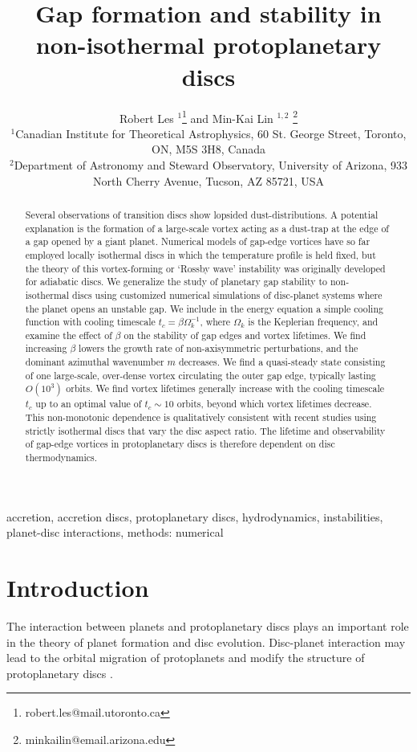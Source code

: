 \documentclass[useAMS,usenatbib]{mn2e}
\title[Gaps in non-isothermal discs]{Gap formation and stability in 
  non-isothermal protoplanetary discs}
\author[Les and Lin]{Robert Les
  $^1$\thanks{robert.les@mail.utoronto.ca} and Min-Kai Lin $^{1,2}$
  \thanks{ minkailin@email.arizona.edu} \\ 
  $^1$Canadian Institute for Theoretical Astrophysics,  
  60 St. George Street, Toronto, ON, M5S 3H8, Canada \\
  $^2$Department of Astronomy and Steward Observatory, University of
  Arizona, 933 North Cherry Avenue, Tucson, AZ 85721, USA 
}
\begin{document}
\maketitle
\begin{abstract}
  Several observations of transition discs show lopsided
  dust-distributions. A potential explanation is the formation of a
  large-scale vortex acting as a dust-trap at the edge of a gap opened
  by a giant planet. Numerical models of gap-edge vortices have
  so far employed locally isothermal discs in which the temperature profile is held fixed, but the 
  theory of this vortex-forming or `Rossby wave' instability was
  originally developed for adiabatic discs.  
  We generalize the study of planetary gap stability to non-isothermal
  discs using customized numerical simulations of disc-planet
  systems where the planet opens an unstable gap. 
  We include in the energy equation a simple cooling function with
  cooling timescale $t_c=\beta\Omega_k^{-1}$, where $\Omega_k$ is
  the Keplerian frequency, and examine the effect of $\beta$ on the
  stability of gap edges and vortex lifetimes. We find increasing
  $\beta$ lowers the growth rate of non-axisymmetric perturbations, and the
  dominant azimuthal wavenumber $m$ decreases.  
  We find a quasi-steady state consisting of one  
  large-scale, over-dense vortex circulating the outer gap edge, typically  
  lasting $O(10^3)$ orbits. 
    We find vortex lifetimes generally increase with the cooling
    timescale $t_c$ up to an optimal value of $t_c\sim 10$
    orbits, beyond which vortex lifetimes decrease. This 
  non-monotonic dependence is qualitatively consistent with 
  recent studies using strictly isothermal discs that vary the disc
  aspect ratio.  The lifetime and observability of gap-edge 
    vortices in protoplanetary discs is therefore dependent on disc
    thermodynamics. 
\end{abstract}

\begin{keywords}
  accretion, accretion discs, protoplanetary discs, hydrodynamics, instabilities,
  planet-disc interactions, methods: numerical 
\end{keywords}


\section{Introduction}\label{intro}
The interaction between planets and protoplanetary discs plays an
important role in the theory of planet formation and disc 
evolution. Disc-planet interaction may lead to the orbital migration
of protoplanets and modify the structure of
protoplanetary discs  \citep[see][for a recent review]{baruteau13}.  
\end{document}
